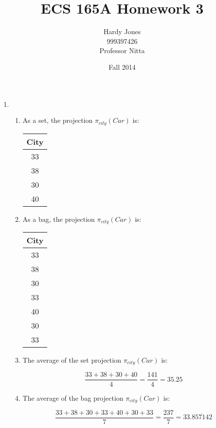 \documentclass[12pt,letterpaper]{article}
\title{ECS 165A Homework 3\vspace{-2ex}}
\author{Hardy Jones\\
        999397426\\
        Professor Nitta\vspace{-2ex}}
\date{Fall 2014}
\begin{document}
  \maketitle

  \begin{enumerate}
    \item

      \begin{enumerate}
        \item
          As a set, the projection $\pi_{city}(Car)$ is:

          \begin{tabular}{c}
            City \\
            \hline
            \hline
            33 \\
            38 \\
            30 \\
            40 \\
          \end{tabular}

        \item
          As a bag, the projection $\pi_{city}(Car)$ is:

          \begin{tabular}{c}
            City \\
            \hline
            \hline
            33 \\
            38 \\
            30 \\
            33 \\
            40 \\
            30 \\
            33 \\
          \end{tabular}

        \item
          The average of the set projection $\pi_{city}(Car)$ is:

          \[
            \frac{33 + 38 + 30 + 40}{4} = \frac{141}{4} = 35.25
          \]

        \item
          The average of the bag projection $\pi_{city}(Car)$ is:

          \[
            \frac{33 + 38 + 30 + 33 + 40 + 30 + 33}{7} = \frac{237}{7} = 33.\overline{857142}
          \]
      \end{enumerate}
  \end{enumerate}
\end{document}
